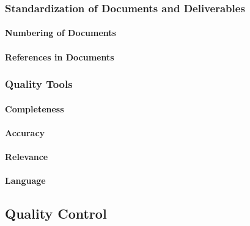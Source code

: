 \documentclass[
  11pt,
]{article}
\begin{document}
\hypertarget{standardization-of-documents-and-deliverables}{%
\subsubsection{Standardization of Documents and
Deliverables}\label{standardization-of-documents-and-deliverables}}

\hypertarget{numbering-of-documents}{%
\paragraph{Numbering of Documents}\label{numbering-of-documents}}

\hypertarget{references-in-documents}{%
\paragraph{References in Documents}\label{references-in-documents}}

\hypertarget{quality-tools}{%
\subsubsection{Quality Tools}\label{quality-tools}}

\hypertarget{completeness}{%
\paragraph{Completeness}\label{completeness}}

\hypertarget{accuracy}{%
\paragraph{Accuracy}\label{accuracy}}

\hypertarget{relevance}{%
\paragraph{Relevance}\label{relevance}}

\hypertarget{language}{%
\paragraph{Language}\label{language}}

\hypertarget{quality-control-1}{%
\subsection{Quality Control}\label{quality-control-1}}
\end{document}

